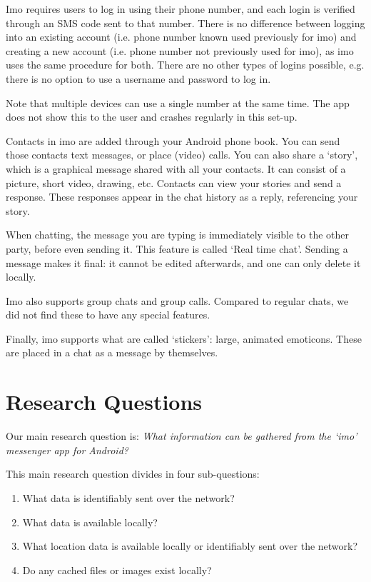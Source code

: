 \documentclass[conference]{IEEEtran}
\begin{document}
Imo requires users to log in using their phone number, and each login is
verified through an SMS code sent to that number. There is no difference between
logging into an existing account (i.e. phone number known used previously for
imo) and creating a new account (i.e. phone number not previously used for imo),
as imo uses the same procedure for both. There are no other types of logins
possible, e.g. there is no option to use a username and password to log in.

Note that multiple devices can use a single number at the same time. The app
does not show this to the user and crashes regularly in this set-up.

Contacts in imo are added through your Android phone book. You can send those
contacts text messages, or place (video) calls. You can also share a `story',
which is a graphical message shared with all your contacts. It can consist of a
picture, short video, drawing, etc. Contacts can view your stories and send a
response. These responses appear in the chat history as a reply, referencing
your story.

When chatting, the message you are typing is immediately visible to the other
party, before even sending it. This feature is called `Real time chat'. Sending
a message makes it final: it cannot be edited afterwards, and one can only
delete it locally.

Imo also supports group chats and group calls. Compared to regular chats, we
did not find these to have any special features.

Finally, imo supports what are called `stickers': large, animated emoticons.
These are placed in a chat as a message by themselves.


\section{Research Questions}\label{sec:researchq}

Our main research question is:
{\it What information can be gathered from the `imo' messenger app for Android?}

This main research question divides in four sub-questions:

\begin{enumerate}
    \item What data is identifiably sent over the network?
    \item What data is available locally?
    \item What location data is available locally or identifiably sent over the
        network?
    \item Do any cached files or images exist locally?
\end{enumerate}
\end{document}

